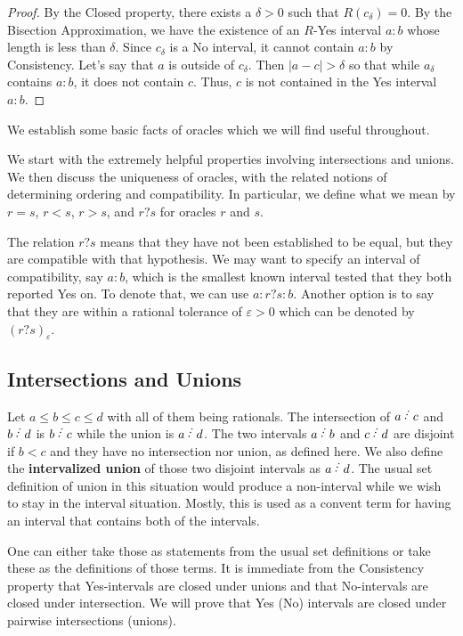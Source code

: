 \documentclass[12pt]{article}
\begin{document}
\begin{proof}
    By the Closed property, there exists a $\delta > 0$ such that $R(c_\delta)=0$. By the Bisection Approximation, we have the existence of an $R$-Yes interval $a:b$ whose length is less than $\delta$. Since $c_\delta$ is a No interval, it cannot contain $a:b$ by Consistency. Let's say that $a$ is outside of $c_\delta$. Then $|a-c| > \delta$ so that while $a_\delta$ contains $a:b$, it does not contain $c$. Thus, $c$ is not contained in the Yes interval $a:b$.
\end{proof}




We establish some basic facts of oracles which we will find useful throughout. 

We start with the extremely helpful properties involving intersections and unions. We then discuss the uniqueness of oracles, with the related notions of determining ordering and compatibility. In particular, we define what we mean by $r = s$, $r<s$, $r>s$, and $r ? s$ for oracles $r$ and $s$. 

The relation $r ? s$ means that they have not been established to be equal, but they are compatible with that hypothesis. We may want to specify an interval of compatibility, say $a:b$, which is the smallest known interval tested that they both reported Yes on. To denote that, we can use $a:r?s:b$. Another option is to say that they are within a rational tolerance of $\varepsilon > 0$ which can be denoted by $(r?s)_{\varepsilon}$.


\subsection{Intersections and Unions}

Let $a \leq b \leq c \leq d$ with all of them being rationals. The intersection of $a\lte c$ and $b\lte d$ is $b\lte c$ while the union is $a\lte d$. The two intervals $a\lte b$ and $c\lte d$ are disjoint if $b < c$ and they have no intersection nor union, as defined here. We also define the \textbf{intervalized union} of those two disjoint intervals as  $a \lte d$. The usual set definition of union in this situation would produce a non-interval while we wish to stay in the interval situation. Mostly, this is used as a  convent term for having an interval that contains both of the intervals. 

One can either take those as statements from the usual set definitions or take these as the definitions of those terms. It is immediate from the Consistency property that Yes-intervals are closed under unions and that No-intervals are closed under intersection. We will prove that Yes (No) intervals are closed under pairwise intersections (unions). 
\end{document}
